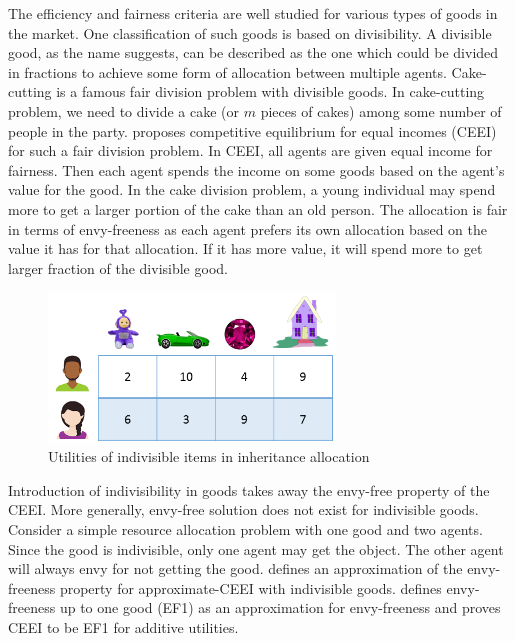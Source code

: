 The efficiency and fairness criteria are well studied for various types of goods in the market. One classification of such goods is based on divisibility. A divisible good, as the name suggests, can be described as the one which could be divided in fractions to achieve some form of allocation between multiple agents. Cake-cutting is a famous fair division problem with divisible goods. In cake-cutting problem, we need to divide a cake (or $m$ pieces of cakes) among some number of people in the party. \citet{varian1973equity} proposes competitive equilibrium for equal incomes (CEEI) for such a fair division problem. In CEEI, all agents are given equal income for fairness. Then each agent spends the income on some goods based on the agent's value for the good. In the cake division problem, a young individual may spend more to get a larger portion of the cake than an old person. The allocation is fair in terms of envy-freeness as each agent prefers its own allocation based on the value it has for that allocation. If it has more value, it will spend more to get larger fraction of the divisible good.

\begin{figure}
\includegraphics[width=3in]{images/indivisible_allocation2x4.png}
\caption{Utilities of indivisible items in inheritance allocation}
\end{figure}

Introduction of indivisibility in goods takes away the envy-free property of the CEEI. More generally, envy-free solution does not exist for indivisible goods. Consider a simple resource allocation problem with one good and two agents. Since the good is indivisible, only one agent may get the object. The other agent will always envy for not getting the good. \citet{budish2011combinatorial} defines an approximation of the envy-freeness property for approximate-CEEI with indivisible goods. \citet{budish2011combinatorial} defines envy-freeness up to one good (EF1) as an approximation for envy-freeness and proves CEEI to be EF1 for additive utilities.

